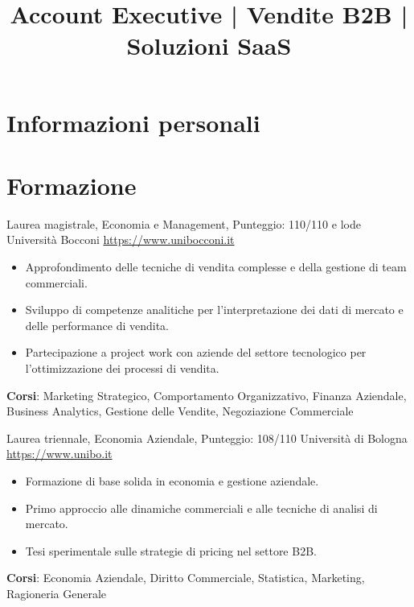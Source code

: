 \documentclass[a4paper, serif, 10pt]{moderncv}
\title{Account Executive | Vendite B2B | Soluzioni SaaS}
\begin{document}
\maketitle

\section{Informazioni personali}

\section{Formazione}

        {Laurea magistrale, Economia e Management, Punteggio: 110/110 e lode}
        {Università Bocconi}
        {\url{https://www.unibocconi.it}}
        {}
        {\begin{itemize}
\item Approfondimento delle tecniche di vendita complesse e della gestione di team commerciali.
\item Sviluppo di competenze analitiche per l'interpretazione dei dati di mercato e delle performance di vendita.
\item Partecipazione a project work con aziende del settore tecnologico per l'ottimizzazione dei processi di vendita.
\end{itemize}
\textbf{Corsi}: Marketing Strategico, Comportamento Organizzativo, Finanza Aziendale, Business Analytics, Gestione delle Vendite, Negoziazione Commerciale}

        {Laurea triennale, Economia Aziendale, Punteggio: 108/110}
        {Università di Bologna}
        {\url{https://www.unibo.it}}
        {}
        {\begin{itemize}
\item Formazione di base solida in economia e gestione aziendale.
\item Primo approccio alle dinamiche commerciali e alle tecniche di analisi di mercato.
\item Tesi sperimentale sulle strategie di pricing nel settore B2B.
\end{itemize}
\textbf{Corsi}: Economia Aziendale, Diritto Commerciale, Statistica, Marketing, Ragioneria Generale}
\end{document}
